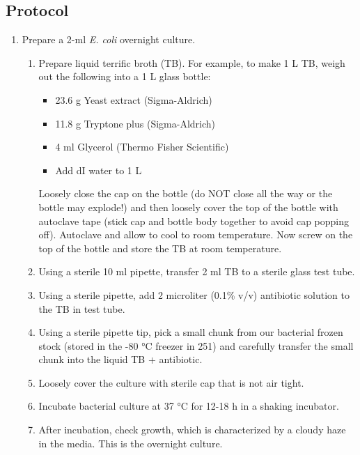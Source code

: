 \subsection{Protocol}
\label{sec:protocol}
\begin{enumerate}

  \item Prepare a 2-ml \textit{E. coli} overnight culture.

  \begin{enumerate}
    \item Prepare liquid terrific broth (TB). For example, to make 1 L TB, weigh out the following into a 1 L glass bottle:
    \begin{itemize}
      \item 23.6 g Yeast extract (Sigma-Aldrich)
      \item 11.8 g Tryptone plus (Sigma-Aldrich)
      \item 4 ml Glycerol (Thermo Fisher Scientific)
      \item Add dI water to 1 L
    \end{itemize}
    Loosely close the cap on the bottle (do NOT close all the way or the bottle may explode!) and then loosely cover the top of the bottle with autoclave tape (stick cap and bottle body together to avoid cap popping off). Autoclave and allow to cool to room temperature. Now screw on the top of the bottle and store the TB at room temperature.
    \item Using a sterile 10 ml pipette, transfer 2 ml TB to a sterile glass test tube.
    \item Using a sterile pipette, add 2 microliter (0.1\% v/v) antibiotic solution to the TB in test tube.
    \item Using a sterile pipette tip, pick a small chunk from our bacterial frozen stock (stored in the -80 °C freezer in 251) and carefully transfer the small chunk into the liquid TB + antibiotic.
    \item Loosely cover the culture with sterile cap that is not air tight.
    \item Incubate bacterial culture at 37 °C for 12-18 h in a shaking incubator.
    \item After incubation, check growth, which is characterized by a cloudy haze in the media. This is the overnight culture.
  \end{enumerate}


\end{enumerate}

